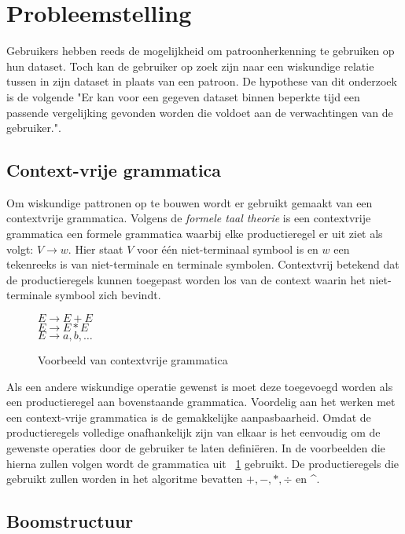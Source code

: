 \documentclass[Main.tex]{subfiles}
\begin{document}
\section{Probleemstelling}
Gebruikers hebben reeds de mogelijkheid om patroonherkenning te gebruiken op hun dataset. Toch kan de gebruiker op zoek zijn naar een wiskundige relatie tussen in zijn dataset in plaats van een patroon. De hypothese van dit onderzoek is de volgende "Er kan voor een gegeven dataset binnen beperkte tijd een passende vergelijking gevonden worden die voldoet aan de verwachtingen van de gebruiker.".

\subsection{Context-vrije grammatica}
Om wiskundige pattronen op te bouwen wordt er gebruikt gemaakt van een contextvrije grammatica. Volgens de \textit{formele taal theorie} %
is een contextvrije grammatica een formele grammatica waarbij elke productieregel er uit ziet als volgt: $V \rightarrow w$. Hier staat $V$  voor \'e\'en niet-terminaal symbool is en $w$ een tekenreeks is van niet-terminale en terminale symbolen. Contextvrij betekend dat de productieregels kunnen toegepast worden los van de context waarin het niet-terminale symbool zich bevindt. \\

\begin{figure}[!htb]
\centering
\begin{framed}
$E \rightarrow E + E$ \\
$E \rightarrow E \ast E$ \\
$E \rightarrow a,b,\dotsc$
\end{framed}
\caption{Voorbeeld van contextvrije grammatica}
\label{fig:cfg}
\end{figure}

Als een andere wiskundige operatie gewenst is moet deze toegevoegd worden als een productieregel aan bovenstaande grammatica. Voordelig aan het werken met een context-vrije grammatica is de gemakkelijke aanpasbaarheid. Omdat de productieregels volledige onafhankelijk zijn van elkaar is het eenvoudig om de gewenste operaties door de gebruiker te laten defini\"eren. In de voorbeelden die hierna zullen volgen wordt de grammatica uit ~\ref{fig:cfg} gebruikt. De productieregels die gebruikt zullen worden in het algoritme bevatten $+, -, \ast, \div$ en \^{}.

\subsection{Boomstructuur}
\end{document}
